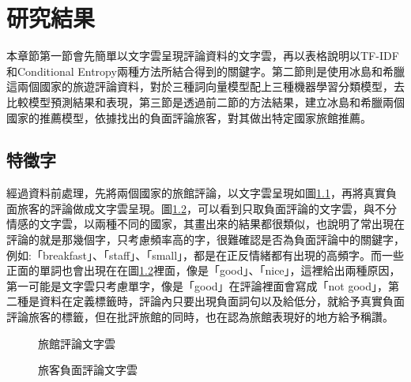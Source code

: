 %
%


\chapter{研究結果}

	本章節第一節會先簡單以文字雲呈現評論資料的文字雲，再以表格說明以TF-IDF和Conditional Entropy兩種方法所結合得到的關鍵字。第二節則是使用冰島和希臘這兩個國家的旅遊評論資料，對於三種詞向量模型配上三種機器學習分類模型，去比較模型預測結果和表現，第三節是透過前二節的方法結果，建立冰島和希臘兩個國家的推薦模型，依據找出的負面評論旅客，對其做出特定國家旅館推薦。
	

\section{特徵字}

	經過資料前處理，先將兩個國家的旅館評論，以文字雲呈現如圖\ref{Fig1}，再將真實負面旅客的評論做成文字雲呈現。圖\ref{Fig2}，可以看到只取負面評論的文字雲，與不分情感的文字雲，以兩種不同的國家，其畫出來的結果都很類似，也說明了常出現在評論的就是那幾個字，只考慮頻率高的字，很難確認是否為負面評論中的關鍵字，例如:「breakfast」、「staff」、「small」，都是在正反情緒都有出現的高頻字。而一些正面的單詞也會出現在在圖\ref{Fig2}裡面，像是「good」、「nice」，這裡給出兩種原因，第一可能是文字雲只考慮單字，像是「good」在評論裡面會寫成「not good」，第二種是資料在定義標籤時，評論內只要出現負面詞句以及給低分，就給予真實負面評論旅客的標籤，但在批評旅館的同時，也在認為旅館表現好的地方給予稱讚。
	
\newpage

	\begin{figure}[h!]
	\centering
	\caption{旅館評論文字雲}\label{Fig1}
	\end{figure}
	
	\begin{figure}[h!]
	\centering
	\caption{旅客負面評論文字雲}\label{Fig2}
	\end{figure}

